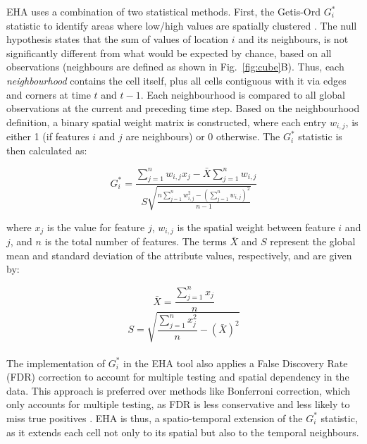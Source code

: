 EHA uses a combination of two statistical methods. First, the Getis-Ord \(G_i^*\) statistic to identify areas where low/high values are spatially clustered \citep{getis_ord}. The null hypothesis
states that the sum of values of location \( i \) and its neighbours, is not significantly different from what would be expected by chance, based on all observations (neighbours are
defined as shown in Fig.~\ref{fig:cube}B). Thus, each \textit{neighbourhood} contains the cell itself, plus all cells contiguous with it via edges and corners at time \(t\) and \(t-1\).
Each neighbourhood is compared to all global observations at the current and preceding time step. Based on the neighbourhood definition,
a binary spatial weight matrix is constructed, where each entry \(w_{i,j}\), is either 1 (if features \(i\) and \(j\) are neighbours) or 0 otherwise. The \(G_i^*\) statistic is then
calculated as:

\begin{equation}
G_i^* = \frac{\displaystyle\sum_{j=1}^{n} w_{i,j} x_j - \bar{X} \displaystyle\sum_{j=1}^{n} w_{i,j}}{S \sqrt{\frac{n \displaystyle\sum_{j=1}^{n} w_{i,j}^2 - \left( \displaystyle\sum_{j=1}^{n} w_{i,j} \right)^2}{n-1}}}
\end{equation}

\bigskip

where \( x_j \) is the value for feature \( j \), 
\( w_{i,j} \) is the spatial weight between feature \( i \) and \( j \), 
and \( n \) is the total number of features. The terms \( \bar{X} \) and \( S \) represent the global mean and standard deviation
of the attribute values, respectively, and are given by:

\begin{equation}
\bar{X} = \frac{\displaystyle\sum_{j=1}^{n} x_j}{n}
\end{equation}
\medskip
\begin{equation}
S = \sqrt{\frac{\displaystyle\sum_{j=1}^{n} x_j^2}{n} - \left(\bar{X}\right)^2}
\end{equation}\\

The implementation of \(G_i^*\) in the EHA tool also applies a False Discovery Rate (FDR) correction to account for multiple testing and spatial dependency in the data.
This approach is preferred over methods like Bonferroni correction, which only accounts for multiple testing, as FDR is less conservative and less likely to miss true 
positives \citep{fdr_correction}. EHA is thus, a spatio-temporal extension of the \(G_i^*\) statistic, as it extends each cell not only to its spatial but
also to the temporal neighbours.

